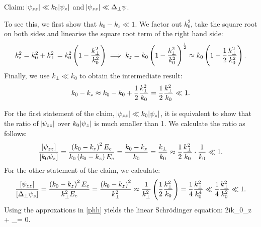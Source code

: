 Claim: $\abs{\psi_{zz}}\ll k_0\abs{\psi_z}$ and 
$\abs{\psi_{zz}}\ll \Delta_\perp\psi$. 

To see this, we first show that $k_0-k_z \ll 1$.  We factor out $k_0^2$, take the
square root on both sides and linearise the square root term of the right hand
side: 
$$ k_z^2=k_0^2+k_\perp^2=k_0^2\left(1-\frac{k_\perp^2}{k_0^2}\right)
\implies
k_z=k_0\left(1-\frac{k_\perp^2}{k_0^2}\right)^\frac{1}{2}
\approx k_0\left(1-\frac{1}{2}\frac{k_\perp^2}{k_0^2}\right). $$
Finally, we use $k_\perp\ll k_0$ to obtain the intermediate result:
$$ k_0-k_z \approx k_0 - k_0 + \frac{1}{2}\frac{k_\perp^2}{k_0}=
\frac{1}{2}\frac{k_\perp^2}{k_0}\ll1. $$

For the first statement of the claim, $\abs{\psi_{zz}}\ll k_0\abs{\psi_z}$, it is equivalent
to show that the ratio of $\abs{\psi_{zz}}$ over $k_0\abs{\psi_z}$ is much smaller than 1. 
We calculate the ratio as follows:
$$
\frac{\left[\psi_{zz}\right]}{\left[k_0\psi_z\right]}=
\frac{\left(k_0-k_z\right)^2 E_c}{k_0\left(k_0-k_z\right)E_c}=
\frac{k_0-k_z}{k_0}=\frac{k_\perp}{k_0}\approx
\frac{1}{2}\frac{k_\perp^2}{k_0}\cdot\frac{1}{k_0}\ll1.
$$
For the other statement of the claim, we calculate:
$$
\frac{\left[\psi_{zz}\right]}{\left[\Delta_\perp\psi_z\right]}=
\frac{\left(k_0-k_z\right)^2 E_c}{k_\perp^2 E_c}=
\frac{\left(k_0-k_z\right)^2}{k_\perp^2}\approx
\frac{1}{k_\perp^2}\left(\frac{1}{2}\frac{k_\perp^2}{k_0}\right)=
\frac{1}{4}\frac{k_\perp^2}{k_0^4}\ll\frac{1}{4}\frac{k_\perp^2}{k_0^2}\ll1.
$$
Using the approxations in \cref{phh} yields the
linear Schr\"odinger equation:
\be \label{lse}
2ik_0\psi_z + \Delta_\perp\psi = 0.
\ee

